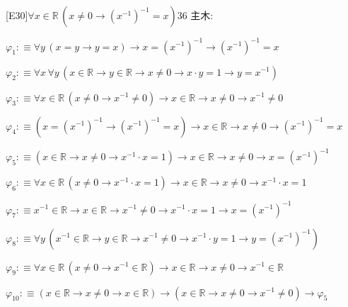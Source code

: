 \begin{fullproof}{[E30]}{$\forall x \in \mathbb{R}\,(x \neq 0 \to (x^{-1})^{-1} = x)$}{36}
\noindent 主木:
\begin{ptree}
\noLine
{}
\noLine
{}
\end{ptree}
\begin{abbrevlist}
\item $\varphi_{1} :\equiv \forall y\,(x = y \to y = x) \to x = (x^{-1})^{-1} \to (x^{-1})^{-1} = x$
\item $\varphi_{2} :\equiv \forall x\,\forall y\,(x \in \mathbb{R} \to y \in \mathbb{R} \to x \neq 0 \to x \cdot y = 1 \to y = x^{-1})$
\item $\varphi_{3} :\equiv \forall x \in \mathbb{R}\,(x \neq 0 \to x^{-1} \neq 0) \to x \in \mathbb{R} \to x \neq 0 \to x^{-1} \neq 0$
\item $\varphi_{4} :\equiv (x = (x^{-1})^{-1} \to (x^{-1})^{-1} = x) \to x \in \mathbb{R} \to x \neq 0 \to (x^{-1})^{-1} = x$
\item $\varphi_{5} :\equiv (x \in \mathbb{R} \to x \neq 0 \to x^{-1} \cdot x = 1) \to x \in \mathbb{R} \to x \neq 0 \to x = (x^{-1})^{-1}$
\item $\varphi_{6} :\equiv \forall x \in \mathbb{R}\,(x \neq 0 \to x^{-1} \cdot x = 1) \to x \in \mathbb{R} \to x \neq 0 \to x^{-1} \cdot x = 1$
\item $\varphi_{7} :\equiv x^{-1} \in \mathbb{R} \to x \in \mathbb{R} \to x^{-1} \neq 0 \to x^{-1} \cdot x = 1 \to x = (x^{-1})^{-1}$
\item $\varphi_{8} :\equiv \forall y\,(x^{-1} \in \mathbb{R} \to y \in \mathbb{R} \to x^{-1} \neq 0 \to x^{-1} \cdot y = 1 \to y = (x^{-1})^{-1})$
\item $\varphi_{9} :\equiv \forall x \in \mathbb{R}\,(x \neq 0 \to x^{-1} \in \mathbb{R}) \to x \in \mathbb{R} \to x \neq 0 \to x^{-1} \in \mathbb{R}$
\item $\varphi_{10} :\equiv (x \in \mathbb{R} \to x \neq 0 \to x \in \mathbb{R}) \to (x \in \mathbb{R} \to x \neq 0 \to x^{-1} \neq 0) \to \varphi_{5}$
\end{abbrevlist}
\end{fullproof}
